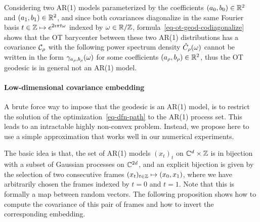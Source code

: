 Considering two AR(1) models parameterized by the coefficients $(a_0,b_0) \in \mathbb{R}^2$ and $(a_1,b_1) \in \mathbb{R}^2$, and since both covariances diagonalize in the same Fourier basis $t \in \mathbb{Z} \mapsto e^{2\imath \pi t \omega}$ indexed by $\omega \in \mathbb{R}/\mathbb{Z}$, formula~\eqref{eq-ot-geod-codiagonalize} shows that the OT barycenter between these two AR(1) distributions has a covariance $\mathcal{C}_\rho$ with the following power spectrum density
$\hat {C}_\rho(\omega)$ cannot be written in the form $\gamma_{a_\rho,b_\rho}(\omega)$ for some coefficients $(a_\rho,b_\rho) \in \mathbb{R}^2$, thus the OT geodesic is in general not an AR(1) model. 


\paragraph{Low-dimensional covariance embedding}

A brute force way to impose that the geodesic is an AR(1) model, is to restrict the solution of the optimization~\eqref{eq-dfn-path} to the AR(1) process set. This leads to an intractable highly non-convex problem. Instead, we propose here to use a simple approximation that works  well in our numerical experiments.

The basic idea is that, the set of AR(1) models $(x_t)_t$ on $\mathbb{C}^d \times \mathbb{Z}$ is in bijection with a subset of Gaussian processes on $\mathbb{C}^{2d}$, and an explicit bijection is given by the selection of two consecutive frames  $(x_t)_{t \in \mathbb{Z}} \mapsto (x_0,x_1)$,
where we have arbitrarily chosen the frames indexed by $t=0$ and $t=1$. Note that this is formally a map between random vectors. The following proposition shows how to compute the covariance of this pair of frames and how to invert the corresponding embedding.

